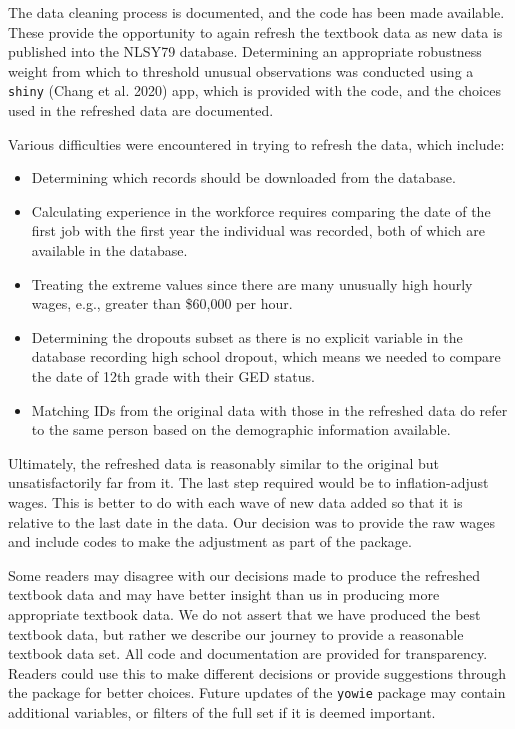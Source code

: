 \documentclass[12pt]{article}
\providecommand{\tightlist}{%
  \setlength{\itemsep}{0pt}\setlength{\parskip}{0pt}}
\begin{document}
The data cleaning process is documented, and the code has been made available. These provide the opportunity to again refresh the textbook data as new data is published into the NLSY79 database. Determining an appropriate robustness weight from which to threshold unusual observations was conducted using a \texttt{shiny} (Chang et al. 2020) app, which is provided with the code, and the choices used in the refreshed data are documented.

Various difficulties were encountered in trying to refresh the data, which include:

\begin{itemize}
\tightlist
\item
  Determining which records should be downloaded from the database.
\item
  Calculating experience in the workforce requires comparing the date of the first job with the first year the individual was recorded, both of which are available in the database.
\item
  Treating the extreme values since there are many unusually high hourly wages, e.g., greater than \$60,000 per hour.
\item
  Determining the dropouts subset as there is no explicit variable in the database recording high school dropout, which means we needed to compare the date of 12th grade with their GED status.
\item
  Matching IDs from the original data with those in the refreshed data do refer to the same person based on the demographic information available.
\end{itemize}

Ultimately, the refreshed data is reasonably similar to the original but unsatisfactorily far from it. The last step required would be to inflation-adjust wages. This is better to do with each wave of new data added so that it is relative to the last date in the data. Our decision was to provide the raw wages and include codes to make the adjustment as part of the package.

Some readers may disagree with our decisions made to produce the refreshed textbook data and may have better insight than us in producing more appropriate textbook data. We do not assert that we have produced the best textbook data, but rather we describe our journey to provide a reasonable textbook data set. All code and documentation are provided for transparency. Readers could use this to make different decisions or provide suggestions through the package for better choices. Future updates of the \texttt{yowie} package may contain additional variables, or filters of the full set if it is deemed important.
\end{document}
